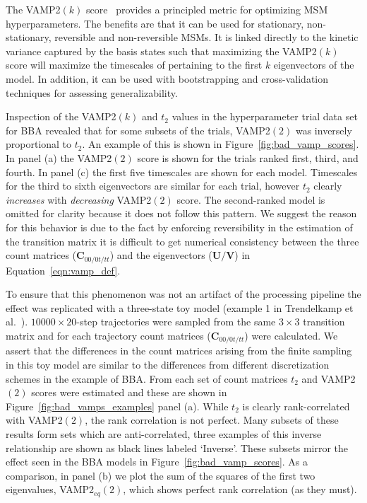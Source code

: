 \documentclass[journal=jacsat,manuscript=article]{achemso}
\begin{document}
The VAMP2$(k)$ score~\cite{wuVariationalApproachLearning2020c} provides a principled metric for optimizing MSM hyperparameters. The benefits are that it can be used for stationary, non-stationary, reversible and non-reversible MSMs. It is linked directly to the kinetic variance captured by the basis states such that maximizing the VAMP2$(k)$ score will maximize the timescales of pertaining to the first $k$ eigenvectors of the model. In addition, it can be used with bootstrapping and cross-validation techniques for assessing generalizability. 

Inspection of the VAMP2$(k)$ and $t_2$ values in the hyperparameter trial data set for BBA revealed that for some subsets of the trials, VAMP2$(2)$ was inversely proportional to $t_2$. An example of this is shown in Figure~\ref{fig:bad_vamp_scores}. In panel (a) the VAMP2$(2)$ score is shown for the trials ranked first, third, and fourth. In panel (c) the first five timescales are shown for each model. Timescales for the third to sixth eigenvectors are similar for each trial, however $t_2$ clearly \emph{increases} with \emph{decreasing} VAMP2$(2)$ score. The second-ranked model is omitted for clarity because it does not follow this pattern. We suggest the reason for this behavior is due to the fact by enforcing reversibility in the estimation of the transition matrix it is difficult to get numerical consistency between the three count matrices ($\mathbf{C}_{00/0t/tt}$) and the eigenvectors ($\mathbf{U}/\mathbf{V}$) in Equation~\ref{eqn:vamp_def}. 

To ensure that this phenomenon was not an artifact of the processing pipeline the effect was replicated with a three-state toy model (example 1 in Trendelkamp et al.~\cite{trendelkamp-schroer_estimation_2015}). $\num{10000}\times20$-step trajectories were sampled from the same $3\times 3$ transition matrix and for each trajectory count matrices ($\mathbf{C}_{00/0t/tt}$) were calculated.  We assert that the differences in the count matrices arising from the finite sampling in this toy model are similar to the differences from different discretization schemes in the example of BBA.  From each set of count matrices $t_2$ and VAMP2$(2)$ scores were estimated and  these are shown in Figure~\ref{fig:bad_vamps_examples} panel (a). While  $t_2$ is clearly rank-correlated with VAMP2$(2)$, the rank correlation is not perfect.  Many subsets of these results form sets which are anti-correlated,  three examples of this inverse relationship are shown as black lines labeled `Inverse'. These subsets mirror the effect seen in the BBA models in Figure~\ref{fig:bad_vamp_scores}.  As a comparison, in panel (b) we plot the sum of the squares of the first two eigenvalues, VAMP2$_{eq}(2)$, which shows perfect rank correlation (as they must). 
\end{document}
